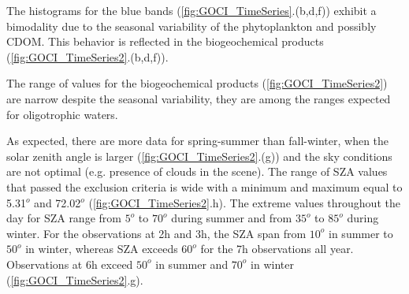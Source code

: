 \documentclass[onecolumn,3p,letterpaper,11pt]{elsarticle}
\begin{document}
The histograms for the blue bands (\autoref{fig:GOCI_TimeSeries}.(b,d,f)) exhibit a bimodality due to the seasonal variability of the phytoplankton and possibly CDOM. This behavior is reflected in the biogeochemical products (\autoref{fig:GOCI_TimeSeries2}.(b,d,f)). 

The range of values for the biogeochemical products (\autoref{fig:GOCI_TimeSeries2}) are narrow despite the seasonal variability, they are among the ranges expected for oligotrophic waters.

As expected, there are more data for spring-summer than fall-winter, when the solar zenith angle is larger (\autoref{fig:GOCI_TimeSeries2}.(g)) and the sky conditions are not optimal (e.g. presence of clouds in the scene). The range of SZA values that passed the exclusion criteria is wide with a minimum and maximum equal to 5.31$^o$ and 72.02$^o$ (\autoref{fig:GOCI_TimeSeries2}.h). The extreme values throughout the day for SZA range from $5^o$ to $70^o$ during summer and from $35^o$ to $85^o$ during winter. For the observations at 2h and 3h, the SZA span from $10^o$ in summer to $50^o$ in winter, whereas SZA exceeds $60^o$ for the 7h observations all year. Observations at 6h exceed $50^o$ in summer and $70^o$ in winter (\autoref{fig:GOCI_TimeSeries2}.g).



\end{document}
